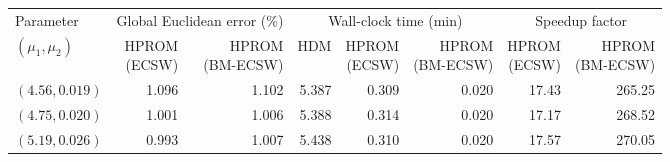 \begin{tabular}{@{}lrrrrrrr@{}}
\toprule
Parameter & \multicolumn{2}{c}{Global Euclidean error (\%)} & \multicolumn{3}{c}{Wall-clock time (min)} & \multicolumn{2}{c}{Speedup factor}\\
\cmidrule(lr){2-3}\cmidrule(lr){4-6}\cmidrule(lr){7-8}
$(\mu_1,\mu_2)$ & \shortstack{HPROM\\(ECSW)} & \shortstack{HPROM\\(BM-ECSW)} & HDM & \shortstack{HPROM\\(ECSW)} & \shortstack{HPROM\\(BM-ECSW)} & \shortstack{HPROM\\(ECSW)} & \shortstack{HPROM\\(BM-ECSW)}\\
\midrule
$(4.56,0.019)$ & 1.096 & 1.102 & 5.387 & 0.309 & 0.020 & 17.43 & 265.25\\
$(4.75,0.020)$ & 1.001 & 1.006 & 5.388 & 0.314 & 0.020 & 17.17 & 268.52\\
$(5.19,0.026)$ & 0.993 & 1.007 & 5.438 & 0.310 & 0.020 & 17.57 & 270.05\\
\bottomrule
\end{tabular}
